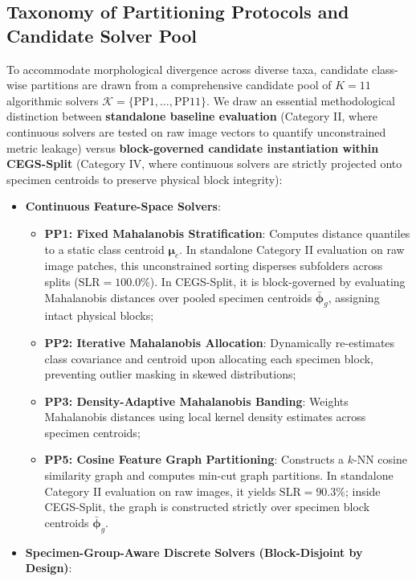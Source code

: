 \documentclass[a4paper,fleqn]{cas-sc}
\begin{document}
\subsection{Taxonomy of Partitioning Protocols and Candidate Solver Pool}
To accommodate morphological divergence across diverse taxa, candidate class-wise partitions are drawn from a comprehensive candidate pool of $K=11$ algorithmic solvers $\mathcal{K} = \{\text{PP1}, \dots, \text{PP11}\}$. We draw an essential methodological distinction between \textbf{standalone baseline evaluation} (Category II, where continuous solvers are tested on raw image vectors to quantify unconstrained metric leakage) versus \textbf{block-governed candidate instantiation within CEGS-Split} (Category IV, where continuous solvers are strictly projected onto specimen centroids to preserve physical block integrity):
\begin{itemize}
\item \textbf{Continuous Feature-Space Solvers}:
  \begin{itemize}
  \item \textbf{PP1: Fixed Mahalanobis Stratification}: Computes distance quantiles to a static class centroid $\boldsymbol{\mu}_c$. In standalone Category II evaluation on raw image patches, this unconstrained sorting disperses subfolders across splits ($\mathrm{SLR} = 100.0\%$). In CEGS-Split, it is block-governed by evaluating Mahalanobis distances over pooled specimen centroids $\bar{\boldsymbol{\phi}}_g$, assigning intact physical blocks;
  \item \textbf{PP2: Iterative Mahalanobis Allocation}: Dynamically re-estimates class covariance and centroid upon allocating each specimen block, preventing outlier masking in skewed distributions;
  \item \textbf{PP3: Density-Adaptive Mahalanobis Banding}: Weights Mahalanobis distances using local kernel density estimates across specimen centroids;
  \item \textbf{PP5: Cosine Feature Graph Partitioning}: Constructs a $k$-NN cosine similarity graph and computes min-cut graph partitions. In standalone Category II evaluation on raw images, it yields $\mathrm{SLR} = 90.3\%$; inside CEGS-Split, the graph is constructed strictly over specimen block centroids $\bar{\boldsymbol{\phi}}_g$.
  \end{itemize}
\item \textbf{Specimen-Group-Aware Discrete Solvers (Block-Disjoint by Design)}:
  \begin{itemize}

\end{itemize}
\end{itemize}
\end{document}
